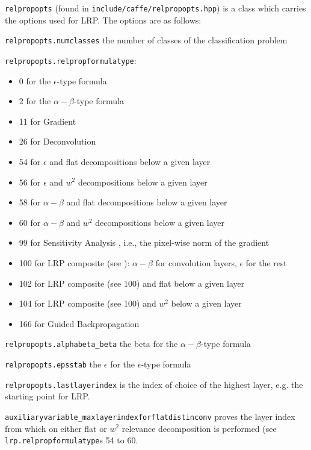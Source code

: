 \documentclass[a4wide]{article}
\begin{document}
\begin{itemize}
\texttt{relpropopts} (found in \texttt{include/caffe/relpropopts.hpp}) is a class which carries the options used for LRP. The options are as follows:

\texttt{relpropopts.numclasses} the number of classes of  the classification problem

\texttt{relpropopts.relpropformulatype}:
\begin{itemize}
\item 0 for the $\epsilon$-type formula
\item 2 for the $\alpha-\beta$-type formula
\item 11 for Gradient
\item 26 for Deconvolution \cite{DBLP:conf/eccv/ZeilerF14}
\item 54 for $\epsilon$ and flat decompositions below a given layer
\item 56 for $\epsilon$ and $w^2$ decompositions below a given layer
\item 58 for $\alpha-\beta$ and flat decompositions below a given layer
\item 60 for $\alpha-\beta$ and $w^2$ decompositions below a given layer
\item 99 for Sensitivity Analysis \cite{DBLP:journals/corr/SimonyanVZ13}, i.e., the pixel-wise norm of the gradient
\item 100 for LRP composite (see \cite{lapuschkin2017understanding,kohlbrenner2019towards}): $\alpha-\beta$ for convolution layers, $\epsilon$ for the rest
\item 102 for LRP composite (see 100) and flat below a given layer
\item 104 for LRP composite (see 100) and $w^2$ below a given layer
\item 166 for Guided Backpropagation \cite{springenberg2014striving}
\end{itemize}


\texttt{relpropopts.alphabeta\_beta} the beta for the $\alpha-\beta$-type formula

\texttt{relpropopts.epsstab} the $\epsilon$ for the $\epsilon$-type formula

\texttt{relpropopts.lastlayerindex} is the index of choice of the highest layer, e.g. the starting point for LRP.

\texttt{auxiliaryvariable\_maxlayerindexforflatdistinconv} proves the layer index from which on either flat or $w^2$ relevance decomposition is performed (see \texttt{lrp.relpropformulatype}s 54 to 60.


\end{itemize}
\end{document}
